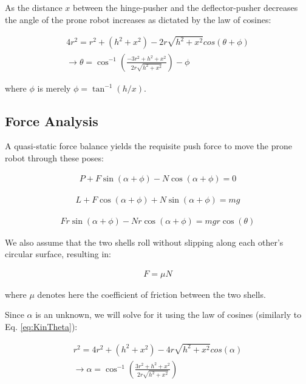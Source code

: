 \documentclass[letterpaper]{report}
\begin{document}
As the distance $x$ between the hinge-pusher and the deflector-pusher decreases the angle of the prone robot increases as dictated by the law of cosines:

\begin{align}
  4 r^2 = r^2 + (h^2 + x^2) - 2r \sqrt{h^2 + x^2} cos(\theta + \phi) \\
  \rightarrow \theta = \cos^{-1} \left( \frac{-3r^2 + h^2 + x^2}{2r \sqrt{h^2 + x^2}} \right) - \phi \label{eq:KinTheta}
\end{align}

where $\phi$ is merely $\phi = \tan^{-1}(h/x)$.

\subsection{Force Analysis}
A quasi-static force balance yields the requisite push force to move the prone robot through these poses:

\begin{align}
  P + F \sin(\alpha + \phi) - N \cos(\alpha + \phi) = 0
  \label{eq:KinQSX}
\end{align}

\begin{align}
  L + F \cos(\alpha + \phi) + N \sin(\alpha + \phi) = mg
  \label{eq:KinQSY}
\end{align}

\begin{align}
  F r \sin(\alpha + \phi) - N r \cos(\alpha + \phi) = mg r \cos(\theta)
  \label{eq:KinTorque}
\end{align}

We also assume that the two shells roll without slipping along each other's circular surface, resulting in:

\begin{align}
  F = \mu N
  \label{eq:KinFriction}
\end{align}

where $\mu$ denotes here the coefficient of friction between the two shells.

Since $\alpha$ is an unknown, we will solve for it using the law of cosines (similarly to Eq. \ref{eq:KinTheta}):

\begin{align}
  r^2 = 4 r^2 + (h^2 + x^2) - 4r \sqrt{h^2 + x^2} cos(\alpha) \\
  \rightarrow \alpha = \cos^{-1} \left( \frac{3r^2 + h^2 + x^2}{2r \sqrt{h^2 + x^2}} \right)
\end{align}
\end{document}
